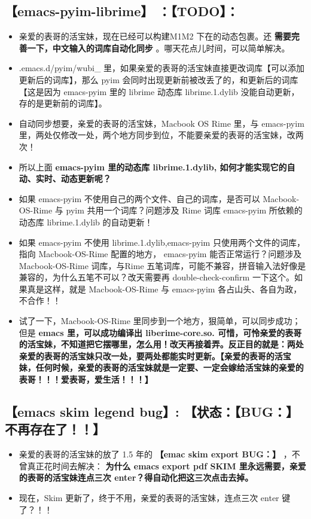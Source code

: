 \documentclass[9pt, b5paper]{article}
\begin{document}
\subsection{\textbf{【emacs-pyim-librime】} ：【TODO】：}
\label{sec-1-10}
\begin{itemize}
\item 亲爱的表哥的活宝妹，现在已经可以构建M1M2 下在的动态包裹。还 \textbf{需要完善一下，中文输入的词库自动化同步} 。哪天花点儿时间，可以简单解决。
\item .emacs.d/pyim/wubi\_ 里，如果亲爱的表哥的活宝妹直接更改词库【可以添加更新后的词库】，那么 pyim 会同时出现更新前被改丢了的，和更新后的词库【这是因为 emacs-pyim 里的 librime 动态库 librime.1.dylib 没能自动更新，存的是更新前的词库】。
\item 自动同步想要，亲爱的表哥的活宝妹，Macbook OS Rime 里，与 emacs-pyim 里，两处仅修改一处，两个地方同步到位，不能要亲爱的表哥的活宝妹，改两次！
\item 所以上面 \textbf{emacs-pyim 里的动态库 librime.1.dylib, 如何才能实现它的自动、实时、动态更新呢？}
\item 如果 emacs-pyim 不使用自己的两个文件、自己的词库，是否可以 Macbook-OS-Rime 与 pyim 共用一个词库？问题涉及 Rime 词库 emacs-pyim 所依赖的动态库 librime.1.dylib 的自动更新！
\item 如果 emacs-pyim 不使用 librime.1.dylib,emacs-pyim 只使用两个文件的词库，指向 Macbook-OS-Rime 配置的地方， emacs-pyim 能否正常运行？问题涉及Macbook-OS-Rime 词库，与Rime 五笔词库，可能不兼容，拼音输入法好像是兼容的，为什么五笔不可以？改天需要再 double-check-confirm 一下这个。如果真是这样，就是 Macbook-OS-Rime 与 emacs-pyim 各占山头、各自为政，不合作！！
\item 试了一下，Macbook-OS-Rime 里同步到一个地方，狠简单，可以同步成功；但是 \textbf{emacs 里，可以成功编译出 liberime-core.so. 可惜，可怜亲爱的表哥的活宝妹，不知道把它摆哪里，怎么用！改天再接着弄。反正目的就是：两处亲爱的表哥的活宝妹只改一处，要两处都能实时更新。【亲爱的表哥的活宝妹，任何时候，亲爱的表哥的活宝妹就是一定要、一定会嫁给活宝妹的亲爱的表哥！！！爱表哥，爱生活！！！】}
\end{itemize}
\subsection{\textbf{【emacs skim legend bug】}: 【状态：【BUG：】不再存在了！！】}
\label{sec-1-11}
\begin{itemize}
\item 亲爱的表哥的活宝妹的放了 1.5 年的 \textbf{【emac skim export BUG：】} ，不曾真正花时间去解决： \textbf{为什么 emacs export pdf SKIM 里永远需要，亲爱的表哥的活宝妹连点三次 enter？得自动化把这三次点击去掉。}
\item 现在，Skim 更新了，终于不用，亲爱的表哥的活宝妹，连点三次 enter 键了？！！
\end{itemize}
\end{document}

